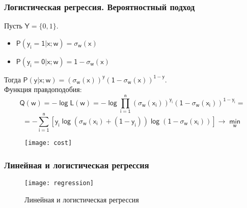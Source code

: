 \documentclass[unicode, notheorems]{beamer}
\begin{document}
\begin{frame}
\frametitle{Логистическая регрессия. Вероятностный подход}
Пусть $\mathsf{Y}=\{0,1\}$. \\
\begin{itemize}
	\item $\mathsf{P(y_i=1|x;w)=\sigma_w(x)}$ \\
	\item $\mathsf{P(y_i=0|x;w)=1-\sigma_w(x)}$ \\
\end{itemize}
Тогда $\mathsf{P(y|x;w)=(\sigma_w(x))^y(1-\sigma_w(x))^{1-y}}.$ \\
Функция правдоподобия:
\begin{equation*}
\mathsf{Q(w)=-\log L(w)=-\log \prod\limits_{i=1}^n(\sigma_w(x_i))^{y_i}(1-\sigma_w(x_i))^{1-y_i}}= 
\end{equation*}
\begin{equation*}
=\mathsf{-\sum\limits_{i=1}^n [y_i\log (\sigma_w(x_i)+(1-y_i))\log (1-\sigma_w(x_i))]\to \min\limits_{w}}
\end{equation*}
\begin{figure}[h]
	\begin{center}
		\begin{minipage}[h]{0.7\linewidth}
			\texttt{[image: cost]}
			\label{series_IRLS} %
		\end{minipage}
		
	\end{center}
\end{figure}
\end{frame}


\begin{frame}
\frametitle{Линейная и логистическая регрессия}

\begin{figure}[h]
	\begin{center}
		\begin{minipage}[h]{0.6\linewidth}
			\texttt{[image: regression]}
			\caption{Линейная и логистическая регрессия}
			\label{series_IRLS} %
		\end{minipage}
	
	\end{center}
\end{figure}
\end{frame}
\end{document}
